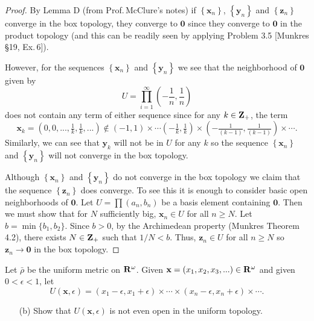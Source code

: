 \begin{proof}
By Lemma D (from Prof.\,McClure's notes) if
$\left\{\mathbf{x}_n\right\}$, $\left\{\mathbf{y}_n\right\}$ and
$\left\{\mathbf{z}_n\right\}$ converge in the box topology, they
converge to $\mathbf{0}$ since they converge to $\mathbf{0}$ in
the product topology (and this can be readily seen by applying
Problem 3.5 [Munkres \S19, Ex.\,6]).

However, for the sequences $\left\{\mathbf{x}_n\right\}$ and
$\left\{\mathbf{y}_n\right\}$ we see that the neighborhood of
$\mathbf{0}$ given by
\[
U=\prod_{i=1}^\infty\left(-\frac{1}{n},\frac{1}{n}\right)
\]
does not contain any term of either sequence since for any
$k\in\mathbf{Z}_+$, the term
\[
\mathbf{x}_k
=\left(0,0,...,\tfrac{1}{k},\tfrac{1}{k},...\right)
\notin
(-1,1)
\times
\cdots\left(-\tfrac{1}{k},\tfrac{1}{k}\right)
\times
\left(-\tfrac{1}{(k-1)},\tfrac{1}{(k-1)}\right)
\times\cdots.
\]
Similarly, we can see that $\mathbf{y}_k$ will not be in $U$ for
any $k$ so the sequence $\left\{\mathbf{x}_n\right\}$ and
$\left\{\mathbf{y}_n\right\}$ will not converge in the box
topology.

Although $\left\{\mathbf{x}_n\right\}$ and
$\left\{\mathbf{y}_n\right\}$ do not converge in the box topology
we claim that the sequence $\left\{\mathbf{z}_n\right\}$ does
converge. To see this it is enough to consider basic open
neighborhoods of $\mathbf{0}$. Let $U=\prod (a_n,b_n)$ be a basis
element containing $\mathbf{0}$. Then we must show that for $N$
sufficiently big, $\mathbf{x}_n\in U$ for all $n\geq N$. Let
$b=\min\{b_1,b_2\}$. Since $b>0$, by the Archimedean property
(Munkres Theorem 4.2), there exists $N\in\mathbf{Z}_+$ such that
$1/N<b$. Thus, $\mathbf{z}_n\in U$ for all $n\geq N$ so
$\mathbf{z}_n\to\mathbf{0}$ in the box topology.
\end{proof}
\newpage
\begin{problem}[Munkres \S20, Ex.\,6]
Let $\bar\rho$ be the uniform metric on $\mathbf{R}^\omega$. Given
$\mathbf{x}=(x_1,x_2,x_3,...)\in\mathbf{R}^\omega$ and given
$0<\epsilon<1$, let
\[
U(\mathbf{x},\epsilon)=
\left(x_1-\epsilon,x_1+\epsilon\right)\times\cdots\times
\left(x_n-\epsilon,x_n+\epsilon\right)\times\cdots.
\]
\begin{enumerate}[noitemsep]
\item[(b)] Show that $U(\mathbf{x},\epsilon)$ is not even open in the
  uniform topology.
\end{enumerate}
\end{problem}
